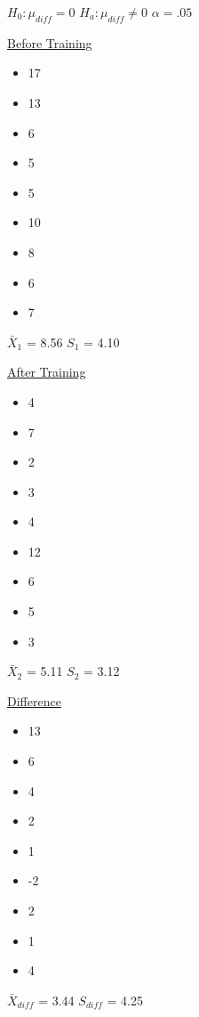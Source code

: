 \documentclass[11pt]{report}
\begin{document}
{
    $H_0: \mu_{diff} = 0$ \newline
    $H_a: \mu_{diff} \neq 0$ \newline
    $\alpha = .05$ \newline
    \begin{multicols}{3}
        \underline{Before Training}
        \begin{itemize}
            \item 17
            \item 13
            \item 6
            \item 5
            \item 5
            \item 10
            \item 8
            \item 6
            \item 7
        \end{itemize}
        $\bar{X}_{1}$ = 8.56 \newline
        $S_{1}$ = 4.10 \newline
        \columnbreak

        \underline{After Training}
        \begin{itemize}
            \item 4
            \item 7
            \item 2
            \item 3
            \item 4
            \item 12
            \item 6
            \item 5
            \item 3
        \end{itemize}
        $\bar{X}_{2}$ = 5.11 \newline
        $S_{2}$ = 3.12 \newline
        \columnbreak 

        \underline{Difference}
        \begin{itemize}
            \item 13
            \item 6
            \item 4
            \item 2
            \item 1
            \item -2
            \item 2
            \item 1
            \item 4
        \end{itemize}
        $\bar{X}_{diff}$ = 3.44 \newline
        $S_{diff}$ = 4.25 \newline
    \end{multicols}

}
\end{document}
